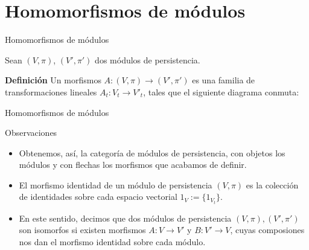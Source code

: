 \documentclass{beamer}
\begin{document}
\section{Homomorfismos de módulos}
\begin{frame}{Homomorfismos de módulos}

Sean $(V,\pi)$, $(V',\pi')$ dos módulos de persistencia.

\begin{block}{\textbf{Definición}}
Un morfismos $A:(V,\pi)\rightarrow (V',\pi')$ es una familia de transformaciones lineales $A_t:V_t\rightarrow V'_t$, tales que el siguiente diagrama conmuta:
\centerline{
}
\end{block}

\end{frame}

\begin{frame}{Homomorfismos de módulos}


\begin{block}{Observaciones}
\begin{itemize}
    \item Obtenemos, así, la categoría de módulos de persistencia, con objetos los módulos y con flechas los morfismos que acabamos de definir. 
    \pause
    \item El morfismo identidad de un módulo de persistencia $(V,\pi)$ es la colección de identidades sobre cada espacio vectorial $1_V:=\{1_{V_t}\}$.
    \pause
    \item En este sentido, decimos que dos módulos de persistencia $(V,\pi), (V',\pi')$ son isomorfos si existen morfismos $A:V\rightarrow V'$ y $B:V'\rightarrow V$, cuyas composiones nos dan el morfismo identidad sobre cada módulo.
\end{itemize}
\end{block}

\end{frame}
\end{document}
